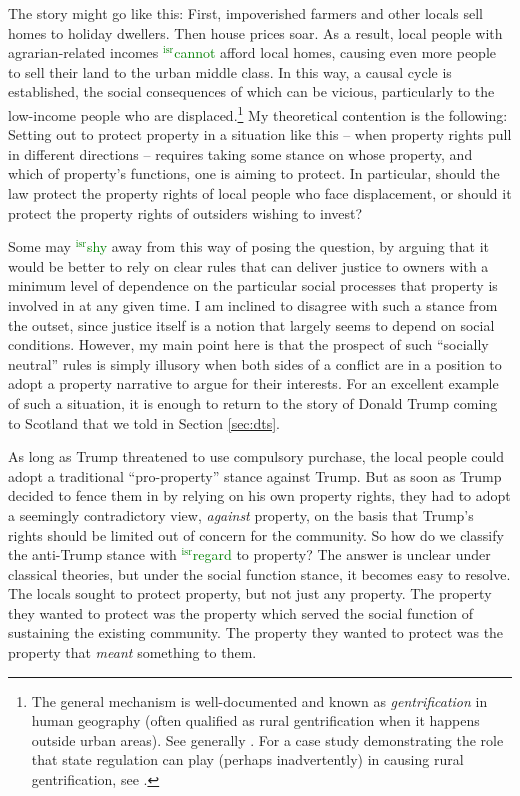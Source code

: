 \documentclass[12pt,a4paper]{book} %
\newcommand{\isr}[1]{\textcolor{green}{$^{\textrm{isr}}${#1}}}
\begin{document}
The story might go like this: First, impoverished farmers and other locals sell homes to holiday dwellers. Then house prices soar. As a result, local people with agrarian-related incomes \isr{cannot} afford local homes, causing even more people to sell their land to the urban middle class. In this way, a causal cycle is established, the social consequences of which can be vicious, particularly to the low-income people who are displaced.\footnote{The general mechanism is well-documented and known as {\it gentrification} in human geography (often qualified as rural gentrification when it happens outside urban areas). See generally \cite{weesep94,phillips93,slater06}. For a case study demonstrating the role that state regulation can play (perhaps inadvertently) in causing rural gentrification, see \cite[1027-1030]{darling05}.} My theoretical contention is the following: Setting out to protect property in a situation like this -- when property rights pull in different directions -- requires taking some stance on whose property, and which of property's functions, one is aiming to protect. In particular, should the law protect the property rights of local people who face displacement, or should it protect the property rights of outsiders wishing to invest?

Some may \isr{shy} away from this way of posing the question, by arguing that it would be better to rely on clear rules that can deliver justice to owners with a minimum level of dependence on the particular social processes that property is involved in at any given time. I am inclined to disagree with such a stance from the outset, since justice itself is a notion that largely seems to depend on social conditions. However, my main point here is that the prospect of such ``socially neutral'' rules is simply illusory when both sides of a conflict are in a position to adopt a property narrative to argue for their interests. For an excellent example of such a situation, it is enough to return to the story of Donald Trump coming to Scotland that we told in Section \ref{sec:dts}.

As long as Trump threatened to use compulsory purchase, the local people could adopt a traditional ``pro-property'' stance against Trump. But as soon as Trump decided to fence them in by relying on his own property rights, they had to adopt a seemingly contradictory view, {\it against} property, on the basis that Trump's rights should be limited out of concern for the community. So how do we classify the anti-Trump stance with \isr{regard} to property? The answer is unclear under classical theories, but under the social function stance, it becomes easy to resolve. The locals sought to protect property, but not just any property. The property they wanted to protect was the property which served the social function of sustaining the existing community. The property they wanted to protect was the property that {\it meant} something to them.
\end{document}
